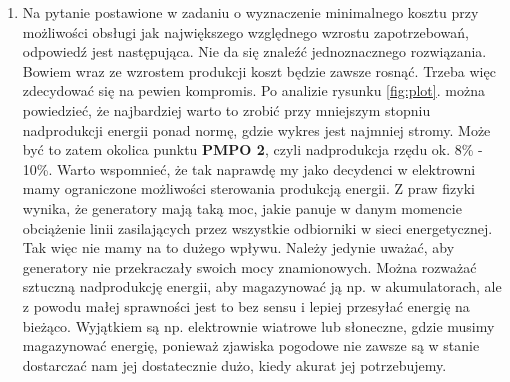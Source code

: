 \documentclass[12pt, twoside, hidelinks, a4paper]{article}
\begin{document}
\begin{enumerate}
\item Na pytanie postawione w zadaniu o wyznaczenie minimalnego kosztu przy możliwości obsługi jak największego względnego wzrostu zapotrzebowań, odpowiedź jest następująca. Nie da się znaleźć jednoznacznego rozwiązania. Bowiem wraz ze wzrostem produkcji koszt będzie zawsze rosnąć. Trzeba więc zdecydować się na pewien kompromis. Po analizie rysunku \ref{fig:plot}. można powiedzieć, że najbardziej warto to zrobić przy mniejszym stopniu nadprodukcji energii ponad normę, gdzie wykres jest najmniej stromy. Może być to zatem okolica punktu \textbf{PMPO 2}, czyli nadprodukcja rzędu ok. 8\% - 10\%. Warto wspomnieć, że tak naprawdę my jako decydenci w elektrowni mamy ograniczone możliwości sterowania produkcją energii. Z praw fizyki wynika, że generatory mają taką moc, jakie panuje w danym momencie obciążenie linii zasilających przez wszystkie odbiorniki w sieci energetycznej. Tak więc nie mamy na to dużego wpływu. Należy jedynie uważać, aby generatory nie przekraczały swoich mocy znamionowych. Można rozważać sztuczną nadprodukcję energii, aby magazynować ją np. w akumulatorach, ale z powodu małej sprawności jest to bez sensu i lepiej przesyłać energię na bieżąco. Wyjątkiem są np. elektrownie wiatrowe lub słoneczne, gdzie musimy magazynować energię, ponieważ zjawiska pogodowe nie zawsze są w stanie dostarczać nam jej dostatecznie dużo, kiedy akurat jej potrzebujemy.
\end{enumerate}

\end{document}
